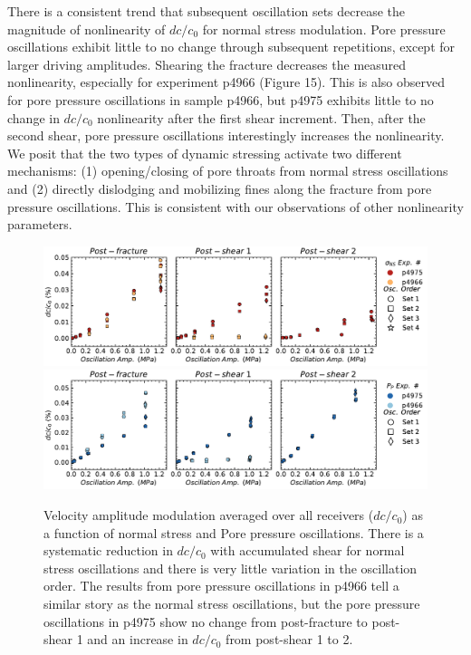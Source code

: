 \documentclass[letterpaper,10pt]{article}
\begin{document}
There is a consistent trend that subsequent oscillation sets decrease the magnitude of nonlinearity of $ dc/c_0 $ for normal stress modulation. Pore pressure oscillations exhibit little to no change through subsequent repetitions, except for larger driving amplitudes.  Shearing the fracture decreases the measured nonlinearity, especially for experiment p4966 (Figure 15). This is also observed for pore pressure oscillations in sample p4966, but p4975 exhibits little to no change in $ dc/c_0 $ nonlinearity after the first shear increment. Then, after the second shear, pore pressure oscillations interestingly increases the nonlinearity. We posit that the two types of dynamic stressing activate two different mechanisms: (1) opening/closing of pore throats from normal stress oscillations and (2) directly dislodging and mobilizing fines along the fracture from pore pressure oscillations. This is consistent with our observations of other nonlinearity parameters. 
\clearpage

\begin{figure}[ht]
	\centering
	\includegraphics[width=1\columnwidth]{dc_amp_NS}
	\includegraphics[width=1\columnwidth]{dc_amp_PP}
	\caption{Velocity amplitude modulation averaged over all receivers ($ dc/c_0 $) as a function of normal stress and Pore pressure oscillations. There is a systematic reduction in $ dc/c_0 $ with accumulated shear for normal stress oscillations and there is very little variation in the oscillation order. The results from pore pressure oscillations in p4966 tell a similar story as the normal stress oscillations, but the pore pressure oscillations in p4975 show no change from post-fracture to post-shear 1 and an increase in $ dc/c_0 $ from post-shear 1 to 2.}
	\label{fig:dc_plots2}
\end{figure}
\clearpage
\end{document}
